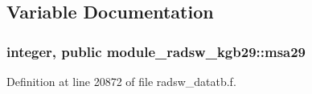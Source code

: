 \subsection{Variable Documentation}
\subsubsection[{\texorpdfstring{msa29}{msa29}}]{\setlength{\rightskip}{0pt plus 5cm}integer, public module\+\_\+radsw\+\_\+kgb29\+::msa29}\hypertarget{namespacemodule__radsw__kgb29_adbee6e5d3b3efc437ff8815e42962b92}{}\label{namespacemodule__radsw__kgb29_adbee6e5d3b3efc437ff8815e42962b92}


Definition at line 20872 of file radsw\+\_\+datatb.\+f.

